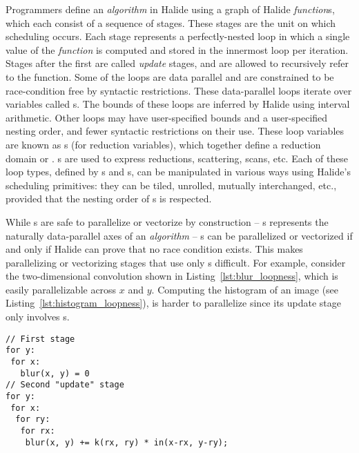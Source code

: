 Programmers define an \emph{algorithm} in Halide using a graph of Halide \emph{function}s, which each consist of a sequence of stages. These stages are the unit on which scheduling occurs. Each stage represents a perfectly-nested loop in which a single value of the \emph{function} is computed and stored in the innermost loop per iteration. Stages after the first are called \emph{update} stages, and are allowed to recursively refer to the function. Some of the loops are data parallel and are constrained to be race-condition free by syntactic restrictions. These data-parallel loops iterate over variables called s. The bounds of these loops are inferred by Halide using interval arithmetic. Other loops may have user-specified bounds and a user-specified nesting order, and fewer syntactic restrictions on their use. These loop variables are known as s (for reduction variables), which together define a reduction domain or . s are used to express reductions, scattering, scans, etc. Each of these loop types, defined by s and s, can be manipulated in various ways using Halide's scheduling primitives: they can be tiled, unrolled, mutually interchanged, etc., provided that the nesting order of s is respected.

While s are safe to parallelize or vectorize by construction -- s represents the naturally data-parallel axes of an \emph{algorithm} -- s can be parallelized or vectorized if and only if Halide can prove that no race condition exists. This makes parallelizing or vectorizing stages that use only s difficult. For example, consider the two-dimensional convolution shown in Listing~\ref{lst:blur_loopness}, which is easily parallelizable across  $x$ and $y$. Computing the histogram of an image (see Listing~\ref{lst:histogram_loopness}), is harder to parallelize since its update stage only involves s.

\begin{lstlisting}[float,caption={Pseudocode for convolution. This algorithm reduces over \code{rx} and \code{ry} and is data-parallel over \code{x} and \code{y}. In the Halide source, \code{rx} and \code{ry} would be \code{RVar}s in a two-dimensional \code{RDom}. \code{x} and \code{y} would be \code{Var}s.}, label={lst:blur_loopness}]
// First stage
for y:
 for x:
   blur(x, y) = 0
// Second "update" stage
for y:
 for x:
  for ry:
   for rx:
    blur(x, y) += k(rx, ry) * in(x-rx, y-ry);
\end{lstlisting}

